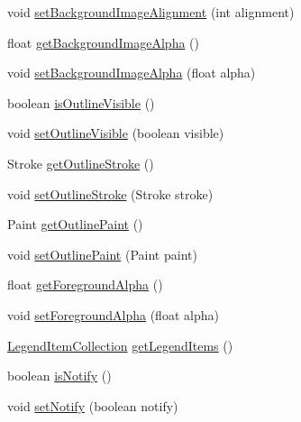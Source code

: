 \begin{DoxyCompactItemize}
\item 
void \mbox{\hyperlink{classorg_1_1jfree_1_1chart_1_1plot_1_1_plot_aa2e7bd23e9c5e6785519e74335ff3af0}{set\+Background\+Image\+Alignment}} (int alignment)
\item 
float \mbox{\hyperlink{classorg_1_1jfree_1_1chart_1_1plot_1_1_plot_a20cf4bf1ab215cef716eac03f336879c}{get\+Background\+Image\+Alpha}} ()
\item 
void \mbox{\hyperlink{classorg_1_1jfree_1_1chart_1_1plot_1_1_plot_a054791107eb3a070dec492dbd1901b04}{set\+Background\+Image\+Alpha}} (float alpha)
\item 
boolean \mbox{\hyperlink{classorg_1_1jfree_1_1chart_1_1plot_1_1_plot_a52723c31418d363029e8b59b6cd43711}{is\+Outline\+Visible}} ()
\item 
void \mbox{\hyperlink{classorg_1_1jfree_1_1chart_1_1plot_1_1_plot_a999872809bfd7cffd4731cb1b7439826}{set\+Outline\+Visible}} (boolean visible)
\item 
Stroke \mbox{\hyperlink{classorg_1_1jfree_1_1chart_1_1plot_1_1_plot_ad2bb94f76f8470681c1b3c41c388deb8}{get\+Outline\+Stroke}} ()
\item 
void \mbox{\hyperlink{classorg_1_1jfree_1_1chart_1_1plot_1_1_plot_a5deedaa7421aebeefe7ac0cfb77b37fb}{set\+Outline\+Stroke}} (Stroke stroke)
\item 
Paint \mbox{\hyperlink{classorg_1_1jfree_1_1chart_1_1plot_1_1_plot_a003c8c8187f26e68a01b9f35db79a556}{get\+Outline\+Paint}} ()
\item 
void \mbox{\hyperlink{classorg_1_1jfree_1_1chart_1_1plot_1_1_plot_af93be31b03f8952fd039f33458135c8b}{set\+Outline\+Paint}} (Paint paint)
\item 
float \mbox{\hyperlink{classorg_1_1jfree_1_1chart_1_1plot_1_1_plot_a1ce9b4391819a9e5ff7e50d16c649fdd}{get\+Foreground\+Alpha}} ()
\item 
void \mbox{\hyperlink{classorg_1_1jfree_1_1chart_1_1plot_1_1_plot_a664fc2bc0ce9e5d2a1e8aa5bc8d01d04}{set\+Foreground\+Alpha}} (float alpha)
\item 
\mbox{\hyperlink{classorg_1_1jfree_1_1chart_1_1_legend_item_collection}{Legend\+Item\+Collection}} \mbox{\hyperlink{classorg_1_1jfree_1_1chart_1_1plot_1_1_plot_ab6cb27f0e674cc0a3bab4d214cc70f5d}{get\+Legend\+Items}} ()
\item 
boolean \mbox{\hyperlink{classorg_1_1jfree_1_1chart_1_1plot_1_1_plot_a5d051f24b95eea6ea09a1c96780c7bd1}{is\+Notify}} ()
\item 
void \mbox{\hyperlink{classorg_1_1jfree_1_1chart_1_1plot_1_1_plot_a2c5acdb70d34e3449b99e8ad646140db}{set\+Notify}} (boolean notify)

\end{DoxyCompactItemize}
